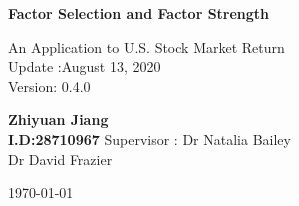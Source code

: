 \begin{titlepage}
\begin{center}
\vspace*{1cm}
\Huge
\textbf{Factor Selection and Factor Strength}

\vspace{0.5cm}
\LARGE
An Application to U.S. Stock Market Return\\
\Large
Update :August 13, 2020 \\
Version: 0.4.0

\vspace{1.5 cm}
\textbf{Zhiyuan Jiang\\I.D:28710967}
\vfill
 Supervisor : Dr Natalia Bailey\\\hspace{30mm} Dr David Frazier
 \vspace{0.8cm}
 
\Large
\today
\end{center}
\end{titlepage}